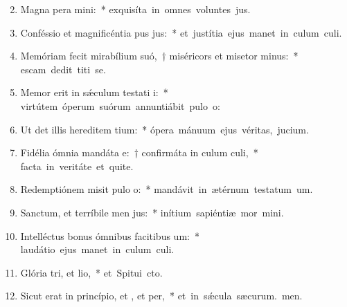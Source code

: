 \begin{flushleft}
\begin{enumerate}[leftmargin=*]
\setcounter{enumi}{1}

\item Magna pera mini:~* \mbox{exquisíta in omnes voluntes jus.}

\item Conféssio et magnificéntia pus jus:~* \mbox{et justítia ejus manet in culum culi.}

\item Memóriam fecit mirabílium suó,~† miséricors et misetor minus:~* \mbox{escam dedit titi se.}

\item Memor erit in s\'{\ae}culum testati i:~* \mbox{virtútem óperum suórum annuntiábit pulo o:}

\item Ut det illis hereditem tium:~* \mbox{ópera mánuum ejus véritas,  jucium.}

\item Fidélia ómnia mandáta e:~† confirmáta in culum culi,~* \mbox{facta in veritáte et quite.}

\item Redemptiónem misit pulo o:~* \mbox{mandávit in ætérnum testatum um.}

\item Sanctum, et terríbile men jus:~* \mbox{inítium sapiéntiæ mor mini.}

\item Intelléctus bonus ómnibus facitibus um:~* \mbox{laudátio ejus manet in culum culi.}

\item Glória tri, et lio,~* \mbox{et Spitui cto.}

\item Sicut erat in princípio, et , et per,~* \mbox{et in s\'{\ae}cula sæcurum. men.}



\end{enumerate}
\end{flushleft}

